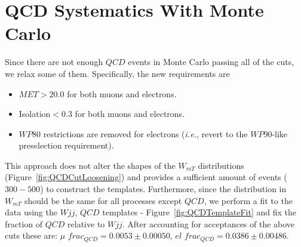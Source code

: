 \appendix
\section{QCD Systematics With Monte Carlo}
\label{app:QCDinMC}
Since there are not enough $QCD$ events in Monte Carlo 
passing all of the cuts, we relax some of them. Specifically, 
the new requirements are
\begin{itemize}
\item $MET>20.0$ for both muons and electrons.
\item Isolation$<0.3$ for both muons and electrons.
\item $WP80$ restrictions are removed for electrons ({\it{i.e.}}, revert 
to the $WP90$-like preselection requirement).
\end{itemize}
This approach does not alter the shapes of the $W_{mT}$ distributions (Figure~\ref{fig:QCDCutLoosening}) and provides a sufficient amount of events ($300-500$) to construct the templates. Furthermore, since the distribution in $W_{mT}$ should be the same for all processes except $QCD$, we perform a fit to the data using the $Wjj$, $QCD$ templates - Figure~\ref{fig:QCDTemplateFit} and fix the fraction of $QCD$ relative to $Wjj$. After accounting for acceptances of the above cuts these are: $\mu$ $frac_{QCD}=0.0053\pm 0.00050$, $el$ $frac_{QCD}=0.0386\pm 0.00486$.

